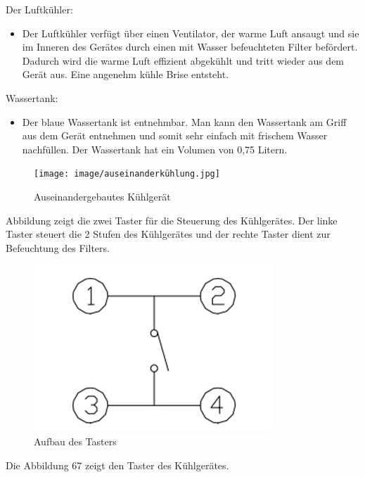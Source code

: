 \vspace{3mm}
Der Luftkühler:
\begin{itemize}
    \item Der Luftkühler verfügt über einen Ventilator, der warme Luft ansaugt und sie im Inneren des Gerätes durch einen mit Wasser befeuchteten Filter befördert. Dadurch wird die warme Luft effizient abgekühlt und tritt wieder aus dem Gerät aus. Eine angenehm kühle Brise entsteht.
\end{itemize}
\pagebreak
Wassertank:
\begin{itemize}
    \item Der blaue Wassertank ist entnehmbar. Man kann den Wassertank am Griff aus dem Gerät entnehmen und somit sehr einfach mit frischem Wasser nachfüllen. Der Wassertank hat ein Volumen von 0,75 Litern.
\end{itemize}
\vspace{3mm}
\begin{figure}[H]
    \centering
    \texttt{[image: image/auseinanderkühlung.jpg]}
    \caption{Auseinandergebautes Kühlgerät}
    \label{fig:enter-label}
\end{figure}
\vspace{3mm}
Abbildung zeigt die zwei Taster für die Steuerung des Kühlgerätes. Der linke Taster steuert die 2 Stufen des Kühlgerätes und der rechte Taster dient zur Befeuchtung des Filters.\\
\vspace{3mm}
\begin{figure}[H]
	\centering
	\includegraphics[scale=1]{image/schalter.png}
	\caption{Aufbau des Tasters}
	\label{fig:enter-label}
\end{figure}
Die Abbildung 67 zeigt den Taster des Kühlgerätes.
\newpage
